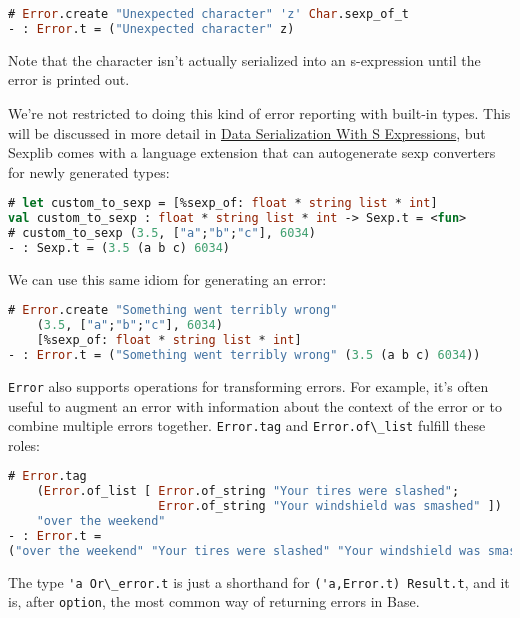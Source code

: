 \begin{lstlisting}[language=Caml]
# Error.create "Unexpected character" 'z' Char.sexp_of_t
- : Error.t = ("Unexpected character" z)
\end{lstlisting}

Note that the character isn't actually serialized into an s-expression
until the error is printed out.

We're not restricted to doing this kind of error reporting with built-in
types. This will be discussed in more detail in
\href{data-serialization.html\#data-serialization-with-s-expressions}{Data
Serialization With S Expressions}, but Sexplib comes with a language
extension that can autogenerate sexp converters for newly generated
types:

\begin{lstlisting}[language=Caml]
# let custom_to_sexp = [%sexp_of: float * string list * int]
val custom_to_sexp : float * string list * int -> Sexp.t = <fun>
# custom_to_sexp (3.5, ["a";"b";"c"], 6034)
- : Sexp.t = (3.5 (a b c) 6034)
\end{lstlisting}

We can use this same idiom for generating an error:

\begin{lstlisting}[language=Caml]
# Error.create "Something went terribly wrong"
    (3.5, ["a";"b";"c"], 6034)
    [%sexp_of: float * string list * int]
- : Error.t = ("Something went terribly wrong" (3.5 (a b c) 6034))
\end{lstlisting}

\passthrough{\lstinline!Error!} also supports operations for
transforming errors. For example, it's often useful to augment an error
with information about the context of the error or to combine multiple
errors together. \passthrough{\lstinline!Error.tag!} and
\passthrough{\lstinline!Error.of\_list!} fulfill these
roles:

\begin{lstlisting}[language=Caml]
# Error.tag
    (Error.of_list [ Error.of_string "Your tires were slashed";
                     Error.of_string "Your windshield was smashed" ])
    "over the weekend"
- : Error.t =
("over the weekend" "Your tires were slashed" "Your windshield was smashed")
\end{lstlisting}

The type \passthrough{\lstinline!'a Or\_error.t!} is just a shorthand
for \passthrough{\lstinline!('a,Error.t) Result.t!}, and it is, after
\passthrough{\lstinline!option!}, the most common way of returning
errors in Base.

